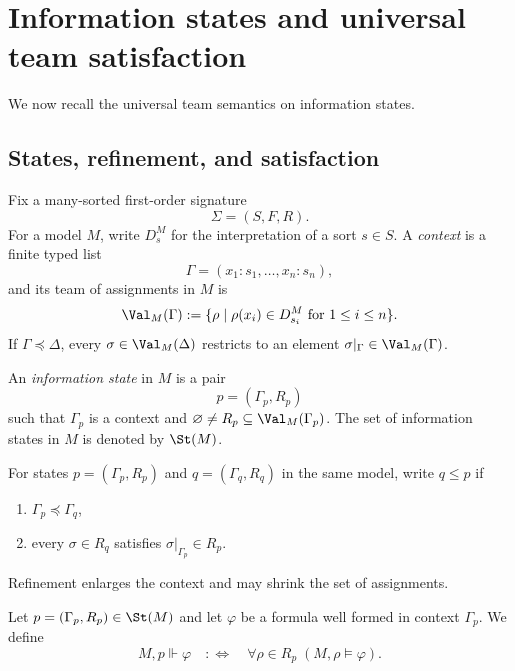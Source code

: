 \section{Information states and universal team satisfaction}\label{sec:information-states}

We now recall the universal team semantics on information states.

\subsection{States, refinement, and satisfaction}

Fix a many-sorted first-order signature
\[
\Sigma=(S,F,R).
\]
For a model $M$, write $D_s^M$ for the interpretation of a sort $s\in S$. A \emph{context} is a finite typed list
\[
\Gamma=(x_1:s_1,\dots,x_n:s_n),
\]
and its team of assignments in $M$ is
\[
\Val_M(\Gamma):=\{\rho\mid \rho(x_i)\in D_{s_i}^M\text{ for }1\le i\le n\}.
\]
If $\Gamma\preceq\Delta$, every $\sigma\in\Val_M(\Delta)$ restricts to an element $\sigma|_{\Gamma}\in\Val_M(\Gamma)$.

\begin{definition}\label{def:information-state}
An \emph{information state} in $M$ is a pair
\[
p=(\Gamma_p,R_p)
\]
such that $\Gamma_p$ is a context and $\varnothing\neq R_p\subseteq \Val_M(\Gamma_p)$. The set of information states in $M$ is denoted by $\St(M)$.
\end{definition}

\begin{definition}[Refinement]\label{def:refinement}
For states $p=(\Gamma_p,R_p)$ and $q=(\Gamma_q,R_q)$ in the same model, write $q\le p$ if
\begin{enumerate}[label=(\roman*),nosep]
\item $\Gamma_p\preceq\Gamma_q$,
\item every $\sigma\in R_q$ satisfies $\sigma|_{\Gamma_p}\in R_p$.
\end{enumerate}
\end{definition}

Refinement enlarges the context and may shrink the set of assignments.

\begin{definition}\label{def:state-forcing}
Let $p=(\Gamma_p,R_p)\in\St(M)$ and let $\varphi$ be a formula well formed in context $\Gamma_p$. We define
\[
M,p\Vdash\varphi
\quad:\Longleftrightarrow\quad
\forall \rho\in R_p\;(M,\rho\models\varphi).
\]
\end{definition}

